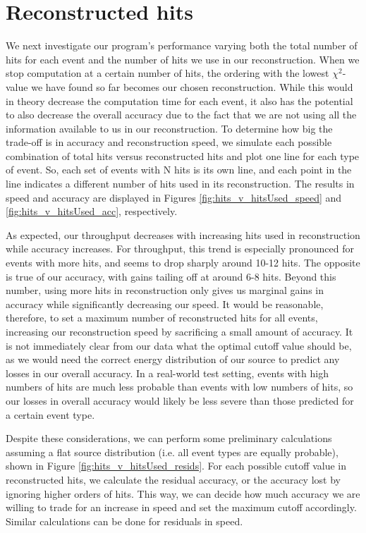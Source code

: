 
\section{Reconstructed hits}
We next investigate our program's performance varying both the total number of hits for each event and the number of hits we use in our reconstruction. When we stop computation at a certain number of hits, the ordering with the lowest $\chi^2$-value we have found so far becomes our chosen reconstruction. While this would in theory decrease the computation time for each event, it also has the potential to also decrease the overall accuracy due to the fact that we are not using all the information available to us in our reconstruction. To determine how big the trade-off is in accuracy and reconstruction speed, we simulate each possible combination of total hits versus reconstructed hits and plot one line for each type of event. So, each set of events with N hits is its own line, and each point in the line indicates a different number of hits used in its reconstruction. The results in speed and accuracy are displayed in Figures \ref{fig:hits_v_hitsUsed_speed} and \ref{fig:hits_v_hitsUsed_acc}, respectively.

As expected, our throughput decreases with increasing hits used in reconstruction while accuracy increases. For throughput, this trend is especially pronounced for events with more hits, and seems to drop sharply around 10-12 hits. The opposite is true of our accuracy, with gains tailing off at around 6-8 hits. Beyond this number, using more hits in reconstruction only gives us marginal gains in accuracy while significantly decreasing our speed. It would be reasonable, therefore, to set a maximum number of reconstructed hits for all events, increasing our reconstruction speed by sacrificing a small amount of accuracy. It is not immediately clear from our data what the optimal cutoff value should be, as we would need the correct energy distribution of our source to predict any losses in our overall accuracy. In a real-world test setting, events with high numbers of hits are much less probable than events with low numbers of hits, so our losses in overall accuracy would likely be less severe than those predicted for a certain event type.

Despite these considerations, we can perform some preliminary calculations assuming a flat source distribution (i.e. all event types are equally probable), shown in Figure \ref{fig:hits_v_hitsUsed_resids}. For each possible cutoff value in reconstructed hits, we calculate the residual accuracy, or the accuracy lost by ignoring higher orders of hits. This way, we can decide how much accuracy we are willing to trade for an increase in speed and set the maximum cutoff accordingly. Similar calculations can be done for residuals in speed.

